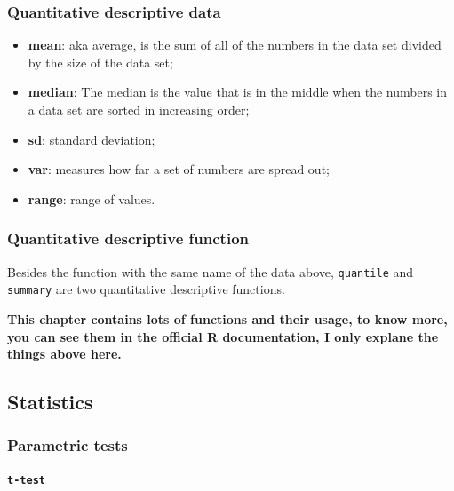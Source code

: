 \documentclass[
]{article}
\begin{document}
\hypertarget{quantitative-descriptive-data}{%
\subsubsection{Quantitative descriptive
data}\label{quantitative-descriptive-data}}

\begin{itemize}
\item
  \textbf{mean}: aka average, is the sum of all of the numbers in the
  data set divided by the size of the data set;
\item
  \textbf{median}: The median is the value that is in the middle when
  the numbers in a data set are sorted in increasing order;
\item
  \textbf{sd}: standard deviation;
\item
  \textbf{var}: measures how far a set of numbers are spread out;
\item
  \textbf{range}: range of values.
\end{itemize}

\hypertarget{quantitative-descriptive-function}{%
\subsubsection{Quantitative descriptive
function}\label{quantitative-descriptive-function}}

Besides the function with the same name of the data above,
\texttt{quantile} and \texttt{summary} are two quantitative descriptive
functions.

\textbf{This chapter contains lots of functions and their usage, to know
more, you can see them in the official R documentation, I only explane
the things above here.}

\hypertarget{statistics}{%
\subsection{Statistics}\label{statistics}}

\hypertarget{parametric-tests}{%
\subsubsection{Parametric tests}\label{parametric-tests}}

\hypertarget{t-test}{%
\paragraph{\texorpdfstring{\texttt{t-test}}{t-test}}\label{t-test}}
\end{document}
